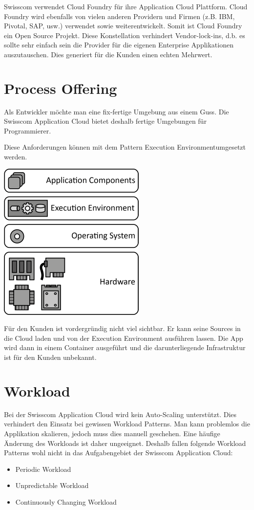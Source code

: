 Swisscom verwendet Cloud Foundry für ihre Application Cloud Plattform. Cloud Foundry wird ebenfalls von vielen anderen Providern und Firmen (z.B. IBM, Pivotal, SAP, usw.) verwendet sowie weiterentwickelt. Somit ist Cloud Foundry ein Open Source Projekt. Diese Konstellation verhindert Vendor-lock-ins, d.b. es sollte sehr einfach sein die Provider für die eigenen Enterprise Applikationen auszutauschen. Dies generiert für die Kunden einen echten Mehrwert.
 
\section{Process Offering}
Als Entwickler möchte man eine fix-fertige Umgebung aus einem Guss. Die Swisscom Application Cloud bietet deshalb fertige Umgebungen für Programmierer. 

Diese Anforderungen können mit dem Pattern \glqq Execution Environment\grqq umgesetzt werden.

\includegraphics[scale=3]{images/execution-environment.png}

Für den Kunden ist vordergründig nicht viel sichtbar. Er kann seine Sources in die Cloud laden und von der Execution Environment ausführen lassen. Die App wird dann in einem Container ausgeführt und die darunterliegende Infrastruktur ist für den Kunden unbekannt. 

\section{Workload}
Bei der Swisscom Application Cloud wird kein Auto-Scaling unterstützt. Dies verhindert den Einsatz bei gewissen Workload Patterns. Man kann problemlos die Applikation skalieren, jedoch muss dies manuell geschehen. Eine häufige Änderung des Workloads ist daher ungeeignet. Deshalb fallen folgende Workload Patterns wohl nicht in das Aufgabengebiet der Swisscom Application Cloud:
\begin{itemize}
\item Periodic Workload
\item Unpredictable Workload
\item Continuously Changing Workload
\end{itemize}

